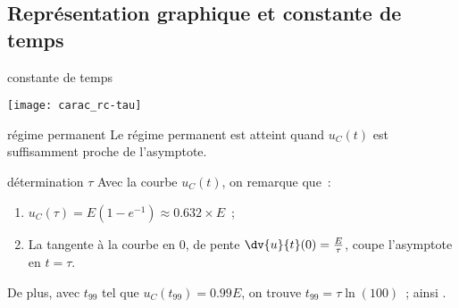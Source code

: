 \documentclass[../main/main.tex]{subfiles}
\begin{document}
\subsection{Représentation graphique et constante de temps}
\begin{tcbraster}[raster columns=2, raster equal height=rows]
    \begin{impl}[label=impl:tauRC]{constante de temps}
        \begin{center}
            \texttt{[image: carac\_rc-tau]}
        \end{center}
    \end{impl}
    \begin{tcolorbox}[blankest, raster multicolumn=1]%
        \begin{tcbraster}[raster columns=1]
            \begin{defi}[label=def:regmperma]{régime permanent}
                Le régime permanent est atteint quand $u_C(t)$ est
                suffisamment proche de l'asymptote.
            \end{defi}
            \begin{exem}[label=impl:déterm]{détermination $\tau$}
                Avec la courbe $u_C(t)$, on remarque que~:
                \begin{enumerate}
                    \item $u_C(\tau) = E \left( 1-e^{-1} \right) \approx
                        \num{0.632}\times E$~;
                    \item La tangente à la courbe en 0, de pente
                        $\dv{u}{t} (0) = \frac{E}{\tau}$, coupe l'asymptote en $t
                        = \tau$.
                \end{enumerate}
                De plus, avec $t_{99}$ tel que $u_C(t_{99}) = \num{0.99}E$, on
                trouve $t_{99} = \tau\ln(100)$~; ainsi .
            \end{exem}
        \end{tcbraster}
    \end{tcolorbox}
\end{tcbraster}
\end{document}
